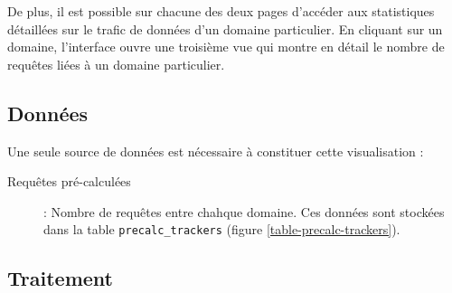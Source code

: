 		De plus, il est possible sur chacune des deux pages d'accéder aux statistiques détaillées sur le trafic de données d'un domaine particulier. En cliquant sur un domaine, l'interface ouvre une troisième vue qui montre en détail le nombre de requêtes liées à un domaine particulier.

	\newpage

	\subsection{Données}

		Une seule source de données est nécessaire à constituer cette visualisation :
		\begin{description}
			\item[Requêtes pré-calculées] : Nombre de requêtes entre chahque domaine. Ces données sont stockées dans la table \texttt{precalc\_trackers} (figure \ref{table-precalc-trackers}).
		\end{description}

		\FloatBarrier

	\subsection{Traitement}

